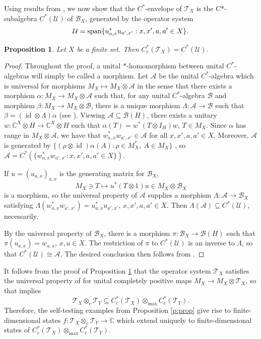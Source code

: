 \documentclass[11pt]{amsart}
\newtheorem{proposition}[theorem]{Proposition}
\theoremstyle{definition}
\DeclareMathOperator{\id}{id}
\newcommand{\cl}[1]{\mathcal{#1}}
\newcommand{\mc}[1]{\mathcal{#1}}
\newcommand{\ten}{\otimes}
\newcommand{\C}{\mathbb{C}}
\begin{document}
Using results from \cite{bks}, 
we now show that the $C^*$-envelope of $\cl{T}_X$ is the 
C*-subalgebra $C^*(\cl U)$ of $\cl{B}_X$, generated by the 
operator system
$$\cl U = {\rm span}\{u_{a,x}^*u_{a',x'}:x,x',a,a'\in X\}.$$


\begin{proposition}\label{p:env} 
Let $X$ be a finite set. Then
$C^*_{e}(\cl{T}_X)=C^*(\cl U)$.
\end{proposition}

\begin{proof} 
Throughout the proof, a unital $*$-homomorphism between unital $C^*$-algebras will simply be called a morphism. Let $\cl{A}$ be the unital $C^*$-algebra which is universal for morphisms $M_X\mapsto M_X\ten {\cl A}$
in the sense that 
there exists a morphism $\alpha:M_X\to M_X\ten \cl{A}$ 
such that, for any unital $C^*$-algebra $\cl{B}$ and morphism $\beta:M_X\to M_X\ten \cl{B}$, there is a unique morphism $\Lambda:\cl{A}\to\cl{B}$ such that $\beta=(\id\ten\Lambda)\alpha$ 
(see \cite[Theorem 2.3]{bks}). Viewing $\cl{A}\subseteq\mc{B}(H)$, there exists a unitary $w:\C^X\ten H\to\C^X\ten H$ such that $\alpha(T) = w^*(T \ten I_H)w$, $T\in M_X$. Since $\alpha$ has range in $M_X\ten\cl{A}$, we have that $w_{a,x}^*w_{a',x'}\in\cl{A}$ for all $x,x',a,a'\in X$. Moreover, $\cl{A}$ is generated by $\{(\rho\ten\id)\alpha(A) : \rho\in M_X^*, \ A\in M_X\}$ \cite[Theorem 2.3]{bks}, so $\cl{A}=C^*(\{w_{a,x}^*w_{a',x'}: x,x',a,a'\in X\})$. 

If $u=(u_{a,x})_{a,x}$ is the generating matrix for $\cl{B}_X$, 
$$M_X\ni T\mapsto u^*(T\ten 1)u\in M_X\ten \cl{B}_X$$ 
is a morphism, so the universal property of $\cl{A}$ supplies a morphism $\Lambda:\cl{A}\to\cl{B}_X$ satisfying $\Lambda(w_{a,x}^*w_{a',x'})=u_{a,x}^*u_{a',x'}$, $x,x',a,a'\in X$. Then $\Lambda(\cl{A})\subseteq 
C^*(\cl U)$, necessarily. 

By the universal property of $\cl{B}_X$, there is a morphism 
$\pi : \cl{B}_X\to\cl{B}(H)$ such that $\pi(u_{a,x}) = w_{a,x}$, $x,a\in X$. The restriction of $\pi$ to 
$C^*(\cl U)$ is an inverse to $\Lambda$, so that 
$C^*(\cl U)\cong\cl{A}$.
The desired conclusion then follows from \cite[Theorem 3.8]{bks}.
\end{proof}


It follows from the proof of Proposition \ref{p:env} that the operator system $\cl{T}_X$ satisfies the universal property of \cite[Theorem 3.3]{bks} for unital completely positive maps $M_X\to M_X\ten \cl{T}_X$, so that \cite[Corollary 3.11]{bks} implies $$\cl{T}_X\ten_{c}\cl{T}_Y\subseteq C^*_e(\cl{T}_X)\ten_{\max} C^*_e(\cl{T}_Y).$$
Therefore, the self-testing examples from Proposition \ref{p:prop} give rise to finite-dimensional states $f:\cl{T}_X\ten_{c} \cl{T}_Y\to\C$ which extend uniquely to finite-dimensional states of $C^*_e(\cl{T}_X)\ten_{\max} C^*_e(\cl{T}_Y)$.
\end{document}
